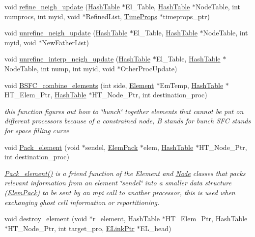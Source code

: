 \begin{CompactItemize}
\item 
void \hyperlink{classElement_n6}{refine\_\-neigh\_\-update} (\hyperlink{classHashTable}{Hash\-Table} $\ast$El\_\-Table, \hyperlink{classHashTable}{Hash\-Table} $\ast$Node\-Table, int numprocs, int myid, void $\ast$Refined\-List, \hyperlink{structTimeProps}{Time\-Props} $\ast$timeprops\_\-ptr)
\item 
void \hyperlink{classElement_n7}{unrefine\_\-neigh\_\-update} (\hyperlink{classHashTable}{Hash\-Table} $\ast$El\_\-Table, \hyperlink{classHashTable}{Hash\-Table} $\ast$Node\-Table, int myid, void $\ast$New\-Father\-List)
\item 
void \hyperlink{classElement_n8}{unrefine\_\-interp\_\-neigh\_\-update} (\hyperlink{classHashTable}{Hash\-Table} $\ast$El\_\-Table, \hyperlink{classHashTable}{Hash\-Table} $\ast$Node\-Table, int nump, int myid, void $\ast$Other\-Proc\-Update)
\item 
void \hyperlink{classElement_n9}{BSFC\_\-combine\_\-elements} (int side, \hyperlink{classElement}{Element} $\ast$Em\-Temp, \hyperlink{classHashTable}{Hash\-Table} $\ast$HT\_\-Elem\_\-Ptr, \hyperlink{classHashTable}{Hash\-Table} $\ast$HT\_\-Node\_\-Ptr, int destination\_\-proc)
\begin{CompactList}\small\item\em this function figures out how to \char`\"{}bunch\char`\"{} together elements that cannot be put on different processors because of a constrained node, B stands for bunch SFC stands for space filling curve \item\end{CompactList}\item 
void \hyperlink{classElement_n10}{Pack\_\-element} (void $\ast$sendel, \hyperlink{structElemPack}{Elem\-Pack} $\ast$elem, \hyperlink{classHashTable}{Hash\-Table} $\ast$HT\_\-Node\_\-Ptr, int destination\_\-proc)
\begin{CompactList}\small\item\em \hyperlink{classElement_n10}{Pack\_\-element()} is a friend function of the Element and \hyperlink{classNode}{Node} classes that packs relevant information from an element \char`\"{}sendel\char`\"{} into a smaller data structure (\hyperlink{structElemPack}{Elem\-Pack}) to be sent by an mpi call to another processor, this is used when exchanging ghost cell information or repartitioning. \item\end{CompactList}\item 
void \hyperlink{classElement_n11}{destroy\_\-element} (void $\ast$r\_\-element, \hyperlink{classHashTable}{Hash\-Table} $\ast$HT\_\-Elem\_\-Ptr, \hyperlink{classHashTable}{Hash\-Table} $\ast$HT\_\-Node\_\-Ptr, int target\_\-pro, \hyperlink{structElementLink}{ELink\-Ptr} $\ast$EL\_\-head)

\end{CompactItemize}
